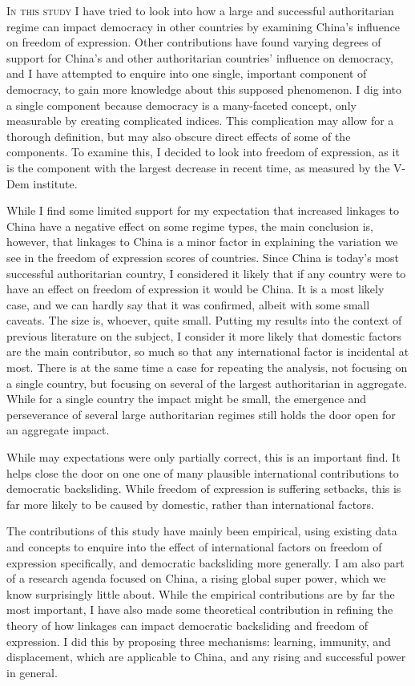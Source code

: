 \lettrine{I}{n this study} I have tried to look into how a large and successful authoritarian regime can impact democracy in other countries by examining China's influence on freedom of expression. Other contributions have found varying degrees of support for China's and other authoritarian countries' influence on democracy, and I have attempted to enquire into one single, important component of democracy, to gain more knowledge about this supposed phenomenon. I dig into a single component because democracy is a many-faceted concept, only measurable by creating complicated indices. This complication may allow for a thorough definition, but may also obscure direct effects of some of the components. To examine this, I decided to look into freedom of expression, as it is the component with the largest decrease in recent time, as measured by the V-Dem institute.

While I find some limited support for my expectation that increased linkages to China have a negative effect on some regime types, the main conclusion is, however, that linkages to China is a minor factor in explaining the variation we see in the freedom of expression scores of countries. Since China is today's most successful authoritarian country, I considered it likely that if any country were to have an effect on freedom of expression it would be China. It is a most likely case, and we can hardly say that it was confirmed, albeit with some small caveats. The size is, whoever, quite small. Putting my results into the context of previous literature on the subject, I consider it more likely that domestic factors are the main contributor, so much so that any international factor is incidental at most. There is at the same time a case for repeating the analysis, not focusing on a single country, but focusing on several of the largest authoritarian in aggregate. While for a single country the impact might be small, the emergence and perseverance of several large authoritarian regimes still holds the door open for an aggregate impact.

While may expectations were only partially correct, this is an important find. It helps close the door on one one of many plausible international contributions to democratic backsliding. While freedom of expression is suffering setbacks, this is far more likely to be caused by domestic, rather than international factors.

The contributions of this study have mainly been empirical, using existing data and concepts to enquire into the effect of international factors on freedom of expression specifically, and democratic backsliding more generally. I am also part of a research agenda focused on China, a rising global super power, which we know surprisingly little about. While the empirical contributions are by far the most important, I have also made some theoretical contribution in refining the theory of how linkages can impact democratic backsliding and freedom of expression. I did this by proposing three mechanisms: learning, immunity, and displacement, which are applicable to China, and any rising and successful power in general.

